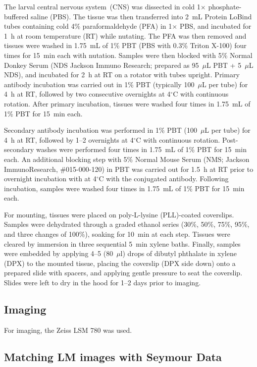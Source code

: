     The larval central nervous system~(CNS) was dissected in cold 1$\times$ phosphate-buffered saline (PBS). The tissue was then transferred into 2~mL Protein LoBind tubes containing cold 4\% paraformaldehyde (PFA) in 1$\times$ PBS, and incubated for 1~h at room temperature (RT) while nutating. The PFA was then removed and tissues were washed in 1.75~mL of 1\% PBT (PBS with 0.3\% Triton X-100) four times for 15~min each with nutation.  
    Samples were then blocked with 5\% Normal Donkey Serum (NDS Jackson Immuno Research; prepared as 95~$\mu$L PBT + 5~$\mu$L NDS), and incubated for 2~h at RT on a rotator with tubes upright.
    Primary antibody incubation was carried out in 1\% PBT (typically 100~$\mu$L per tube) for 4~h at RT, followed by two consecutive overnights at 4$^\circ$C with continuous rotation.  After primary incubation, tissues were washed four times in 1.75~mL of 1\% PBT for 15~min each.  

    Secondary antibody incubation was performed in 1\% PBT (100~$\mu$L per tube) for 4~h at RT, followed by 1--2 overnights at 4$^\circ$C with continuous rotation. Post-secondary washes were performed four times in 1.75~mL of 1\% PBT for 15~min each. An additional blocking step with 5\% Normal Mouse Serum (NMS; Jackson ImmunoResearch, \#015-000-120) in PBT was carried out for 1.5~h at RT prior to overnight incubation with at 4$^\circ$C with the conjugated antibody. Following incubation, samples were washed four times in 1.75~mL of 1\% PBT for 15~min each.  

    For mounting, tissues were placed on poly-L-lysine (PLL)-coated coverslips. Samples were dehydrated through a graded ethanol series (30\%, 50\%, 75\%, 95\%, and three changes of 100\%), soaking for 10~min at each step. Tissues were cleared by immersion in three sequential 5~min xylene baths. Finally, samples were embedded by applying 4--5 (80~$\mu$l) drops of dibutyl phthalate in xylene (DPX) to the mounted tissue, placing the coverslip (DPX side down) onto a prepared slide with spacers, and applying gentle pressure to seat the coverslip. Slides were left to dry in the hood for 1--2 days prior to imaging.

    \subsection{Imaging}
    For imaging, the Zeiss LSM 780 was used.

\subsection{Matching LM images with Seymour Data} %




